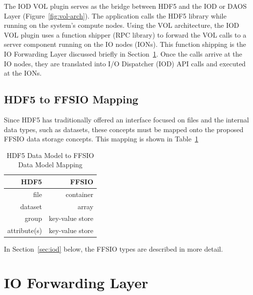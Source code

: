 \documentclass[conference]{IEEEtran}
\begin{document}

The IOD VOL plugin serves as the bridge between HDF5 and the IOD or DAOS Layer
(Figure~\ref{fig:vol-arch}). The application calls the HDF5 library while
running on the system's compute nodes. Using the VOL architecture, the IOD VOL
plugin uses a function shipper (RPC library) to forward the VOL calls to a
server component running on the IO nodes (IONs). This function shipping is the
IO Forwarding Layer discussed briefly in Section~\ref{sec:iof}. Once the calls
arrive at the IO nodes, they are translated into I/O Dispatcher (IOD) API calls
and executed at the IONs.

\subsection{HDF5 to FFSIO Mapping}
\label{sec:hdf-to-ffsio}

Since HDF5 has traditionally offered an interface focused on files and the
internal data types, such as datasets, these concepts must be mapped onto the
proposed FFSIO data storage concepts. This mapping is shown in Table~\ref{tab:mapping}

\begin{table}[ht]
    \centering
    \caption[HDF5 to FFSIO Mapping]{HDF5 Data Model to FFSIO Data Model Mapping}
    \bigskip

    \begin{tabular}{|r|r|}
\hline
HDF5 & FFSIO\\
\hline
file & container \\
dataset & array \\
group & key-value store \\
attribute(s) & key-value store \\
\hline
    \end{tabular}
    \label{tab:mapping}
\end{table}

In Section~\ref{sec:iod} below, the FFSIO types are described in more detail.

\section{IO Forwarding Layer}
\label{sec:iof}
\end{document}
